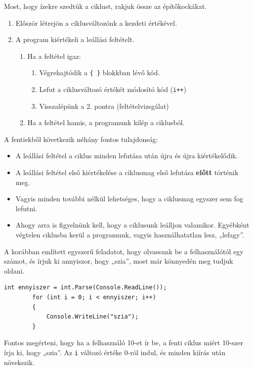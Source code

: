 \documentclass[a4paper]{article}
\begin{document}
	Most, hogy ízekre szedtük a ciklust, rakjuk össze az építőkockákat.
	
	\begin{enumerate}
		\item Először létrejön a ciklusváltozónk a kezdeti értékével.
		\item A program kiértékeli a leállási feltételt.
		\begin{enumerate}
			\item Ha a feltétel igaz:
			\begin{enumerate}
				\item Végrehajtódik a \lstinline!{ }! blokkban lévő kód.
				\item Lefut a ciklusváltozó értékét módosító kód (\lstinline{i++})
				\item Visszalépünk a 2. pontra (feltételvizsgálat)
			\end{enumerate}
			\item Ha a feltétel hamis, a programunk kilép a ciklusból.
		\end{enumerate}
	\end{enumerate}
	
	A fentiekből következik néhány fontos tulajdonság:
	\begin{itemize}
		\item A leállási feltétel a ciklus minden lefutása után újra és újra kiértékelődik.
		\item A leállási feltétel első kiértékelése a ciklusmag első lefutása \textbf{előtt} történik meg.
		\item Vagyis minden további nélkül lehetséges, hogy a ciklusmag egyszer sem fog lefutni.
		\item Ahogy arra is figyelnünk kell, hogy a ciklusunk leálljon valamikor. Egyébként végtelen ciklusba kerül a programunk, vagyis használhatatlan lesz, „lefagy”.
	\end{itemize}
	
	A korábban említett egyszerű feladatot, hogy olvassunk be a felhasználótól egy számot, és írjuk ki annyiszor, hogy „szia”, most már könnyedén meg tudjuk oldani.
	
	\begin{lstlisting}[caption=Számláló ciklus példa, label=lst:forExample]
		int ennyiszer = int.Parse(Console.ReadLine());
		for (int i = 0; i < ennyiszer; i++)
		{
			Console.WriteLine("szia");
		}
	\end{lstlisting}
	
	Fontos megérteni, hogy ha a felhasználó 10-et ír be, a fenti ciklus miért 10-szer írja ki, hogy „szia”. Az \lstinline{i} változó értéke 0-ról indul, és minden kiírás után növekszik.
	
\end{document}
